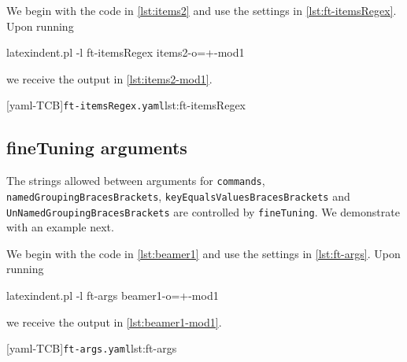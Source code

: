  \begin{example}
 We begin with the code in \cref{lst:items2} and use the settings in
 \cref{lst:ft-itemsRegex}. Upon running

 \begin{commandshell}
latexindent.pl -l ft-itemsRegex items2-o=+-mod1
\end{commandshell}

 we receive the output in \cref{lst:items2-mod1}.

 \begin{cmhtcbraster}[raster columns=3,
   raster left skip=-3.5cm,
   raster right skip=-2cm,
   raster column skip=.03\linewidth]
  [yaml-TCB]{\texttt{ft-itemsRegex.yaml}}{lst:ft-itemsRegex}
 \end{cmhtcbraster}
 \end{example}

\subsection{fineTuning arguments}\label{subsec:finetuning:arguments}
 The strings allowed between arguments for \texttt{commands}, \texttt{namedGroupingBracesBrackets},
 \texttt{keyEqualsValuesBracesBrackets} and \texttt{UnNamedGroupingBracesBrackets}
 are controlled by \texttt{fineTuning}. We demonstrate with an example next.

 \begin{example}
 We begin with the code in \cref{lst:beamer1} and use the settings in \cref{lst:ft-args}.
 Upon running

 \begin{commandshell}
latexindent.pl -l ft-args beamer1-o=+-mod1
\end{commandshell}

 we receive the output in \cref{lst:beamer1-mod1}.

 \begin{cmhtcbraster}[raster columns=3,
   raster left skip=-3.5cm,
   raster right skip=-2cm,
   raster column skip=.03\linewidth]
  [yaml-TCB]{\texttt{ft-args.yaml}}{lst:ft-args}
 \end{cmhtcbraster}
 \end{example}

